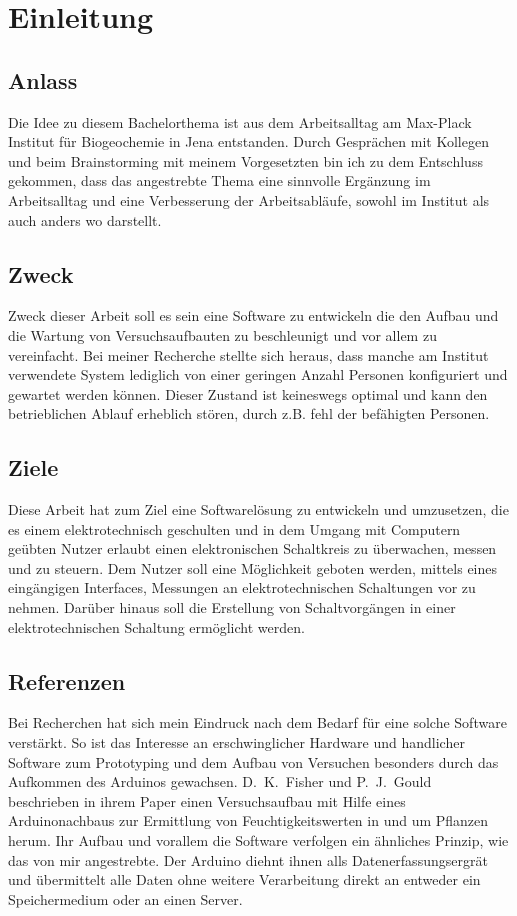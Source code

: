 \chapter{Einleitung}
\section{Anlass}
Die Idee zu diesem Bachelorthema ist aus dem Arbeitsalltag am Max-Plack Institut
für Biogeochemie in Jena entstanden. Durch Gesprächen mit Kollegen und beim
\gls{Brainstorming} mit meinem Vorgesetzten bin ich zu dem Entschluss gekommen, 
dass das angestrebte Thema eine sinnvolle Ergänzung im Arbeitsalltag und eine
Verbesserung der Arbeitsabläufe, sowohl im Institut als auch anders wo
darstellt.

\section{Zweck}
Zweck dieser Arbeit soll es sein eine Software zu entwickeln die den Aufbau und
die Wartung von Versuchsaufbauten zu beschleunigt und vor allem zu
vereinfacht. Bei meiner Recherche stellte sich heraus, dass manche am Institut
verwendete System lediglich von einer geringen Anzahl Personen konfiguriert und
gewartet werden können. Dieser Zustand ist keineswegs optimal und kann den
betrieblichen Ablauf erheblich stören, durch z.B. fehl der befähigten Personen.
\section{Ziele}
Diese Arbeit hat zum Ziel eine Softwarelösung zu entwickeln und umzusetzen, die 
es einem elektrotechnisch geschulten und in dem Umgang mit Computern geübten 
Nutzer erlaubt einen elektronischen Schaltkreis zu überwachen, messen und zu 
steuern. Dem Nutzer soll eine Möglichkeit geboten werden, mittels eines eingängigen Interfaces, Messungen an elektrotechnischen Schaltungen vor zu nehmen. Darüber hinaus soll die Erstellung von Schaltvorgängen in einer elektrotechnischen Schaltung ermöglicht werden.
\section{Referenzen}
Bei Recherchen hat sich mein Eindruck nach dem Bedarf für eine solche Software 
verstärkt. So ist das Interesse an erschwinglicher Hardware und handlicher 
Software zum Prototyping und dem Aufbau von Versuchen besonders durch das 
Aufkommen des Arduinos gewachsen. D.~K.~Fisher und P.~J.~Gould~\cite{ModernInstrumentation} beschrieben in ihrem Paper einen 
Versuchsaufbau mit Hilfe eines Arduinonachbaus zur Ermittlung von 
Feuchtigkeitswerten in und um Pflanzen herum. Ihr Aufbau und vorallem die 
Software verfolgen ein ähnliches Prinzip, wie das von mir angestrebte. Der 
Arduino diehnt ihnen alls Datenerfassungsergrät und übermittelt alle Daten ohne 
weitere Verarbeitung direkt an entweder ein Speichermedium oder an einen 
Server. 

